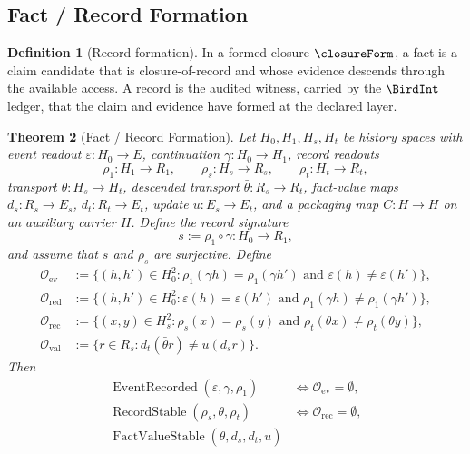 \documentclass[11pt]{article}
\newtheorem{theorem}{Theorem}[section]
\theoremstyle{definition}
\newtheorem{definition}[theorem]{Definition}
\begin{document}
\subsection{Fact / Record Formation}\label{sec:status-records-coherence:fact-record}

\begin{definition}[Record formation]\label{def:record-formation}
In a formed closure \(\closureForm\), a fact is a claim candidate
that is closure-of-record and whose evidence descends through the
available access.  A record is the audited witness, carried by the
\(\BirdInt\) ledger, that the claim and evidence have formed at the
declared layer.
\end{definition}

\begin{theorem}[Fact / Record Formation]\label{thm:F20}
Let \(H_0,H_1,H_s,H_t\) be history spaces with event readout
\(\varepsilon:H_0\to E\), continuation \(\gamma:H_0\to H_1\),
record readouts
\[
  \rho_1:H_1\to R_1,\qquad
  \rho_s:H_s\to R_s,\qquad
  \rho_t:H_t\to R_t,
\]
transport \(\theta:H_s\to H_t\), descended transport
\(\bar\theta:R_s\to R_t\), fact-value maps
\(d_s:R_s\to E_s\), \(d_t:R_t\to E_t\), update
\(u:E_s\to E_t\), and a packaging map \(C:H\to H\) on an auxiliary
carrier \(H\).  Define the record signature
\[
  s:=\rho_1\circ\gamma:H_0\to R_1,
\]
and assume that \(s\) and \(\rho_s\) are surjective.  Define
\begin{align*}
  \mathcal O_{\mathrm{ev}}
  &:=
  \{(h,h')\in H_0^2:
      \rho_1(\gamma h)=\rho_1(\gamma h')
      \text{ and } \varepsilon(h)\ne\varepsilon(h')\},\\
  \mathcal O_{\mathrm{red}}
  &:=
  \{(h,h')\in H_0^2:
      \varepsilon(h)=\varepsilon(h')
      \text{ and } \rho_1(\gamma h)\ne\rho_1(\gamma h')\},\\
  \mathcal O_{\mathrm{rec}}
  &:=
  \{(x,y)\in H_s^2:
      \rho_s(x)=\rho_s(y)
      \text{ and } \rho_t(\theta x)\ne\rho_t(\theta y)\},\\
  \mathcal O_{\mathrm{val}}
  &:=
  \{r\in R_s:
      d_t(\bar\theta r)\ne u(d_s r)\}.
\end{align*}
Then
\begin{align*}
  \operatorname{EventRecorded}(\varepsilon,\gamma,\rho_1)
  &\iff \mathcal O_{\mathrm{ev}}=\emptyset,\\
  \operatorname{RecordStable}(\rho_s,\theta,\rho_t)
  &\iff \mathcal O_{\mathrm{rec}}=\emptyset,\\
  \operatorname{FactValueStable}(\bar\theta,d_s,d_t,u)

\end{align*}
\end{theorem}
\end{document}
